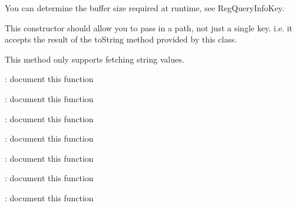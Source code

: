 \begin{DoxyRefList}
You can determine the buffer size required at runtime, see Reg\+Query\+Info\+Key.  
\item[\label{todo__todo000001}%
\hypertarget{todo__todo000001}{}%
Member \hyperlink{class_key_path_ae333110e571e2126ce2e9a19f4900ab7}{Key\+Path\+:\+:Key\+Path} (std\+::string key\+\_\+name)]This constructor should allow you to pass in a path, not just a single key. i.\+e. it accepts the result of the to\+String method provided by this class.  
\item[\label{todo__todo000006}%
\hypertarget{todo__todo000006}{}%
Member \hyperlink{class_simple_registry_access_accef2c679695c6e05a9e7c1c2a962481}{Simple\+Registry\+Access\+:\+:get\+Value\+At\+Path} (\hyperlink{class_key_path}{Key\+Path} key\+\_\+path, std\+::string value\+\_\+name)]This method only supports fetching string values.  
\item[\label{todo__todo000007}%
\hypertarget{todo__todo000007}{}%
Member \hyperlink{class_test_framework_a4f37e58d8b67f9da66372cf43f4281ae}{Test\+Framework\+:\+:add\+Test} (std\+::function$<$ bool(void)$>$ test\+Function)]\+: document this function  
\item[\label{todo__todo000008}%
\hypertarget{todo__todo000008}{}%
Member \hyperlink{class_test_framework_ace2588c0b0043546abc584b1d1b08e96}{Test\+Framework\+:\+:execute} ()]\+: document this function  
\item[\label{todo__todo000009}%
\hypertarget{todo__todo000009}{}%
Member \hyperlink{class_test_framework_ae12aac94ee9a745eb3ce46f5d003dcf2}{Test\+Framework\+:\+:get\+Tests\+Status} ()]\+: document this function  
\item[\label{todo__todo000010}%
\hypertarget{todo__todo000010}{}%
Member \hyperlink{class_test_framework_ad35b7b750378155531cf65e8163b67dd}{Test\+Framework\+:\+:get\+Total\+Tests\+Run} ()]\+: document this function  
\item[\label{todo__todo000011}%
\hypertarget{todo__todo000011}{}%
Member \hyperlink{class_test_framework_a34508c693cf7a3be01a3975065fa2457}{Test\+Framework\+:\+:get\+Total\+Tests\+Run\+Successfully} ()]\+: document this function  
\item[\label{todo__todo000012}%
\hypertarget{todo__todo000012}{}%
Member \hyperlink{class_test_framework_a80e30a085718a9e3db4e6f4e79cc9d48}{Test\+Framework\+:\+:Test\+Framework} ()]\+: document this function  
\item[\label{todo__todo000013}%
\hypertarget{todo__todo000013}{}%
Member \hyperlink{class_test_framework_aad3d6888fe40a083e767061a1ebf0c1d}{Test\+Framework\+:\+:$\sim$\+Test\+Framework} ()]\+: document this function 
\end{DoxyRefList}